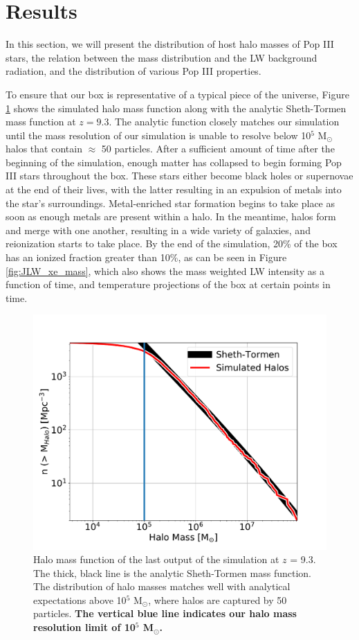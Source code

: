 \documentclass[fleqn,usenatbib]{mnras}
\begin{document}
\section{Results}
In this section, we will present the distribution of host halo masses of Pop III stars, the relation between the mass distribution and the LW background radiation, and the distribution of various Pop III properties.

To ensure that our box is representative of a typical piece of the universe, Figure \ref{fig:hmf} shows the simulated halo mass function along with the analytic Sheth-Tormen mass function at $z = 9.3$. The analytic function closely matches our simulation until the mass resolution of our simulation is unable to resolve below 10$^{5}$ M$_{\odot}$ halos that contain $\approx$ 50 particles. After a sufficient amount of time after the beginning of the simulation, enough matter has collapsed to begin forming Pop III stars throughout the box. These stars either become black holes or supernovae at the end of their lives, with the latter resulting in an expulsion of metals into the star's surroundings. Metal-enriched star formation begins to take place as soon as enough metals are present within a halo. In the meantime, halos form and merge with one another, resulting in a wide variety of galaxies, and reionization starts to take place. By the end of the simulation, 20\% of the box has an ionized fraction greater than 10\%, as can be seen in Figure \ref{fig:JLW_xe_mass}, which also shows the mass weighted LW intensity as a function of time, and temperature projections of the box at certain points in time. 

\begin{figure}
	\includegraphics[width=\columnwidth]{images/hmf.pdf}
    \caption{Halo mass function of the last output of the simulation at $z$ = 9.3. The thick, black line is the analytic Sheth-Tormen mass function. The distribution of halo masses matches well with analytical expectations above 10$^{5}$ M$_{\odot}$, where halos are captured by 50 particles. \textbf{The vertical blue line indicates our halo mass resolution limit of 10$^{5}$ M$_{\odot}$.}}
    \label{fig:hmf}
\end{figure}
\end{document}

